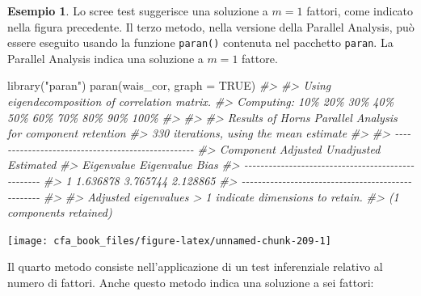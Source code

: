 \documentclass[
  11pt,
]{krantz}
\makeatletter
\newenvironment{Shaded}{\begin{snugshade}}{\end{snugshade}}
\newcommand{\AttributeTok}[1]{\textcolor[rgb]{0.61,0.61,0.61}{#1}}
\newcommand{\CommentTok}[1]{\textcolor[rgb]{0.37,0.37,0.37}{\textit{#1}}}
\newcommand{\ConstantTok}[1]{\textcolor[rgb]{0,0,0}{#1}}
\newcommand{\FunctionTok}[1]{\textcolor[rgb]{0,0,0}{#1}}
\newcommand{\NormalTok}[1]{#1}
\newcommand{\StringTok}[1]{\textcolor[rgb]{0.5,0.5,0.5}{#1}}
\newenvironment{kframe}{%
\medskip{}
\setlength{\fboxsep}{.8em}
 \def\at@end@of@kframe{}%
 \ifinner\ifhmode%
  \def\at@end@of@kframe{\end{minipage}}%
  \begin{minipage}{\columnwidth}%
 \fi\fi%
 \def\FrameCommand##1{\hskip\@totalleftmargin \hskip-\fboxsep
 \colorbox{shadecolor}{##1}\hskip-\fboxsep
     \hskip-\linewidth \hskip-\@totalleftmargin \hskip\columnwidth}%
 \MakeFramed {\advance\hsize-\width
   \@totalleftmargin\z@ \linewidth\hsize
   \@setminipage}}%
 {\par\unskip\endMakeFramed%
 \at@end@of@kframe}
\renewenvironment{Shaded}{\begin{kframe}}{\end{kframe}}
\theoremstyle{definition}
\theoremstyle{definition}
\newtheorem{example}{Esempio}[chapter]
\theoremstyle{definition}
\theoremstyle{definition}
\theoremstyle{remark}
\makeatother
\begin{document}
\begin{example}
Lo scree test suggerisce una soluzione a \(m=1\) fattori, come indicato nella figura precedente. Il terzo metodo, nella versione della Parallel Analysis, può essere eseguito usando la funzione \texttt{paran()} contenuta nel pacchetto \texttt{paran}. La Parallel Analysis indica una soluzione a \(m=1\) fattore.

\begin{Shaded}
\begin{Highlighting}[]
\FunctionTok{library}\NormalTok{(}\StringTok{"paran"}\NormalTok{)}
\FunctionTok{paran}\NormalTok{(wais\_cor, }\AttributeTok{graph =} \ConstantTok{TRUE}\NormalTok{)}
\CommentTok{\#\textgreater{} }
\CommentTok{\#\textgreater{} Using eigendecomposition of correlation matrix.}
\CommentTok{\#\textgreater{} Computing: 10\%  20\%  30\%  40\%  50\%  60\%  70\%  80\%  90\%  100\%}
\CommentTok{\#\textgreater{} }
\CommentTok{\#\textgreater{} }
\CommentTok{\#\textgreater{} Results of Horn\textquotesingle{}s Parallel Analysis for component retention}
\CommentTok{\#\textgreater{} 330 iterations, using the mean estimate}
\CommentTok{\#\textgreater{} }
\CommentTok{\#\textgreater{} {-}{-}{-}{-}{-}{-}{-}{-}{-}{-}{-}{-}{-}{-}{-}{-}{-}{-}{-}{-}{-}{-}{-}{-}{-}{-}{-}{-}{-}{-}{-}{-}{-}{-}{-}{-}{-}{-}{-}{-}{-}{-}{-}{-}{-}{-}{-}{-}{-}{-} }
\CommentTok{\#\textgreater{} Component   Adjusted    Unadjusted    Estimated }
\CommentTok{\#\textgreater{}             Eigenvalue  Eigenvalue    Bias }
\CommentTok{\#\textgreater{} {-}{-}{-}{-}{-}{-}{-}{-}{-}{-}{-}{-}{-}{-}{-}{-}{-}{-}{-}{-}{-}{-}{-}{-}{-}{-}{-}{-}{-}{-}{-}{-}{-}{-}{-}{-}{-}{-}{-}{-}{-}{-}{-}{-}{-}{-}{-}{-}{-}{-} }
\CommentTok{\#\textgreater{} 1           1.636878    3.765744      2.128865}
\CommentTok{\#\textgreater{} {-}{-}{-}{-}{-}{-}{-}{-}{-}{-}{-}{-}{-}{-}{-}{-}{-}{-}{-}{-}{-}{-}{-}{-}{-}{-}{-}{-}{-}{-}{-}{-}{-}{-}{-}{-}{-}{-}{-}{-}{-}{-}{-}{-}{-}{-}{-}{-}{-}{-} }
\CommentTok{\#\textgreater{} }
\CommentTok{\#\textgreater{} Adjusted eigenvalues \textgreater{} 1 indicate dimensions to retain.}
\CommentTok{\#\textgreater{} (1 components retained)}
\end{Highlighting}
\end{Shaded}

\begin{center}\texttt{[image: cfa\_book\_files/figure-latex/unnamed-chunk-209-1]} \end{center}

Il quarto metodo consiste nell'applicazione di un test inferenziale relativo al numero di fattori. Anche questo metodo indica una soluzione a sei fattori:


\end{example}
\end{document}
